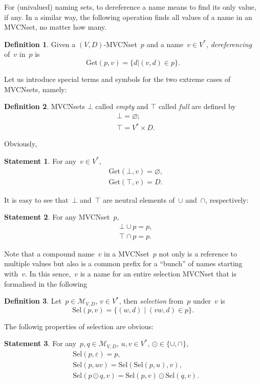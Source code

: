 \documentclass{article}
\theoremstyle{definition}
\newtheorem{Df}{Definition}
\newtheorem{St}{Statement}
\newcommand{\setcharmvcn}{M}
\newcommand{\setsymbol}[3]{\mathcal{#1}_{#2,#3}}
\newcommand{\setmvcn}[2]{\setsymbol{\setcharmvcn}{#1}{#2}}
\newcommand{\select}{\mathrm{Sel}}
\newcommand{\deref}[2]{\mathrm{Get}(#1, #2)}
\begin{document}
For (univalued) naming sets, to dereference a name means to find its only
value, if any.  In a similar way, the following operation finds all values
of a name in an MVCNset, no matter how many.

\begin{Df}\label{df:mvcn-dereferencing}
Given a $(V,D)$-MVCNset~$p$ and a name~$v\in V^\ast$, \emph{dereferencing}
of~$v$ in~$p$ is
\[
  \deref{p}{v} = \{ d | (v, d) \in p \} .
\]
\end{Df}

Let us introduce special terms and symbols for the two extreme cases of
MVCNsets, namely:
\begin{Df}\label{df:mvcn-extremes}
MVCNsets $\bot$ called \emph{empty} and $\top$ called \emph{full} are defined by
\begin{eqnarray*}
  &  \bot = \varnothing ; \\
  &  \top = V^\ast \times D .
\end{eqnarray*}
\end{Df}

Obviously,
\begin{St}\label{st:mvcn-extreme-deref}
For any~$v\in V^\ast$,
\begin{eqnarray*}
  & \deref{\bot}{v} = \varnothing, \\
  & \deref{\top}{v} = D .
\end{eqnarray*}
\end{St}

It is easy to see that~$\bot$ and~$\top$ are neutral elements
of~$\cup$ and~$\cap$, respectively:
\begin{St}\label{st:mvcn-neutrals}
For any MVCNset~$p$,
\begin{eqnarray*}
  & \bot \cup p = p, \\
  & \top \cap p = p .
\end{eqnarray*}
\end{St}

Note that a compound name~$v$ in a MVCNset~$p$ not only is a reference to
multiple values but also is a common prefix for a ``bunch'' of names starting
with~$v$. In this sence,~$v$ is a name for an entire selection MVCNset that is
formalised in the following
\begin{Df}\label{df:mvcn-select}
Let~$p\in\setmvcn{V}{D}$, $v\in V^\ast$, then \emph{selection} from~$p$
under~$v$ is
\[
  \select(p,v) = \{ (w, d) \mid (vw, d)\in p \} .
\]
\end{Df}

The followig properties of selection are obvious:
\begin{St}\label{st:mvcn-selection-properties}
For any~$p,q\in\setmvcn{V}{D}$, $u, v\in V^\ast$, $\odot\in\{\cup, \cap\}$,
\begin{eqnarray*}
  & \select(p,\varepsilon) = p, \\
  & \select(p,uv) = \select(\select(p,u), v), \\
  & \select(p\odot q, v) = \select(p,v)\odot \select(q,v).
\end{eqnarray*}
\end{St}
\end{document}
